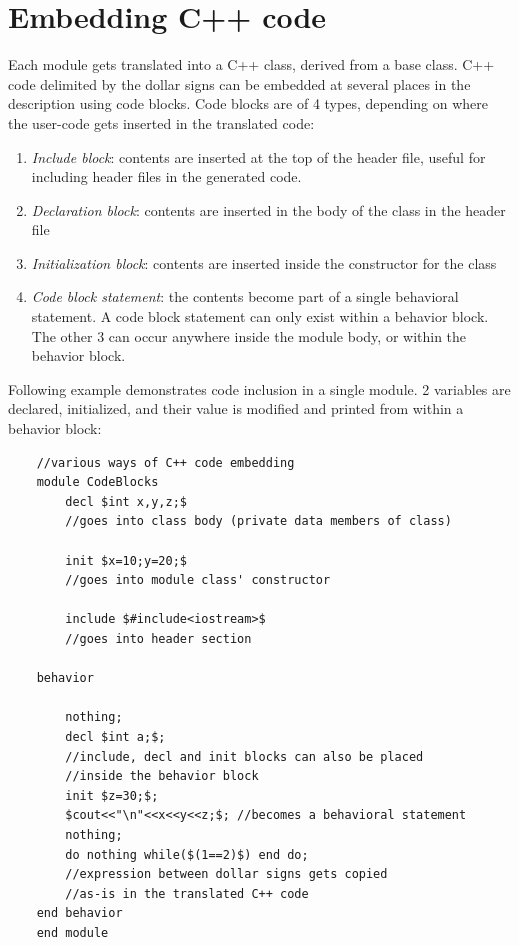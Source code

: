 \documentclass[12pt,a4paper]{report}
\begin{document}
	\section{Embedding C++ code}
	Each module gets translated into a C++ class,
	derived from a base class.
	C++ code delimited by the dollar signs can be embedded at several places in the 
	description using code blocks. Code blocks are of 4 
	types, depending on where the user-code gets inserted in
	the translated code:
	\begin{enumerate}
		\item \emph{Include block}:  contents are inserted at the top of the header file, useful for including
		header files in the generated code.
		\item \emph{Declaration block}: contents are inserted in the body of the class in the header file
		\item \emph{Initialization block}: contents are inserted inside the constructor for the class
		\item \emph{Code block statement}: the contents become part of a single behavioral statement.
		A code block statement can only exist within a behavior block. The other 3 can occur anywhere inside
		the module body, or within the behavior block.
	\end{enumerate}
	Following example demonstrates code inclusion in a single module. 2 variables are declared, initialized,
	and their value is modified and printed from within a behavior block:
    \begin{verbatim}
    //various ways of C++ code embedding
    module CodeBlocks
        decl $int x,y,z;$ 
        //goes into class body (private data members of class)
        
        init $x=10;y=20;$ 
        //goes into module class' constructor
        
        include $#include<iostream>$ 
        //goes into header section

    behavior 

        nothing;
        decl $int a;$; 
        //include, decl and init blocks can also be placed 
        //inside the behavior block
        init $z=30;$;
        $cout<<"\n"<<x<<y<<z;$; //becomes a behavioral statement
        nothing;
        do nothing while($(1==2)$) end do; 
        //expression between dollar signs gets copied 
        //as-is in the translated C++ code
    end behavior
    end module

     \end{verbatim}
\end{document}
